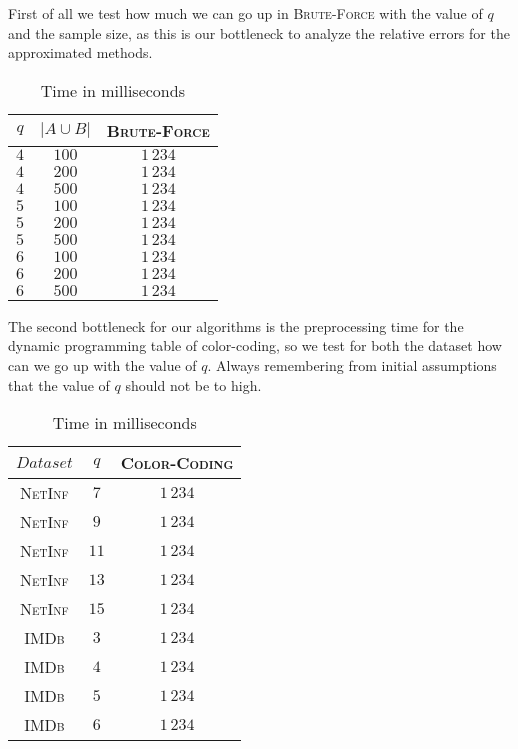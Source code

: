 	First of all we test how much we can go up in \textsc{Brute-Force} with the value of $q$ and the sample size, as this is our bottleneck to analyze the relative errors for the approximated methods.\\ 
	
	\begin{table}[h]
		\centering
		\label{my-label}
		\begin{tabular}{|c|c|c|}
			\hline
			$q$ & $|A \cup B|$ & \textsc{Brute-Force} \\ \hline
			$4$ & $100$        & $1\,234$ \\ \hline
			$4$ & $200$        & $1\,234$ \\ \hline
			$4$ & $500$        & $1\,234$ \\ \hline
			$5$ & $100$        & $1\,234$ \\ \hline
			$5$ & $200$        & $1\,234$ \\ \hline
			$5$ & $500$        & $1\,234$ \\ \hline
			$6$ & $100$        & $1\,234$ \\ \hline
			$6$ & $200$        & $1\,234$ \\ \hline
			$6$ & $500$        & $1\,234$ \\ \hline
		\end{tabular}
		\caption{Time in milliseconds}
	\end{table}
	
	\clearpage
	
	The second bottleneck for our algorithms is the preprocessing time for the dynamic programming table of color-coding, so we test for both the dataset how can we go up with the value of $q$. Always remembering from initial assumptions that the value of $q$ should not be to high. 

	\begin{table}[h]
		\centering
		\label{my-label}
		\begin{tabular}{|c|c|c|}
			\hline
			$Dataset$       & $q$  & \textsc{Color-Coding} \\ \hline
			\textsc{NetInf} & $7$  & $1\,234$ \\ \hline
			\textsc{NetInf} & $9$  & $1\,234$ \\ \hline
			\textsc{NetInf} & $11$ & $1\,234$ \\ \hline
			\textsc{NetInf} & $13$ & $1\,234$ \\ \hline
			\textsc{NetInf} & $15$ & $1\,234$ \\ \hline
			\textsc{IMDb}   & $3$  & $1\,234$ \\ \hline
			\textsc{IMDb}   & $4$  & $1\,234$ \\ \hline
			\textsc{IMDb}   & $5$  & $1\,234$ \\ \hline
			\textsc{IMDb}   & $6$  & $1\,234$ \\ \hline
		\end{tabular}
		\caption{Time in milliseconds}
	\end{table}

